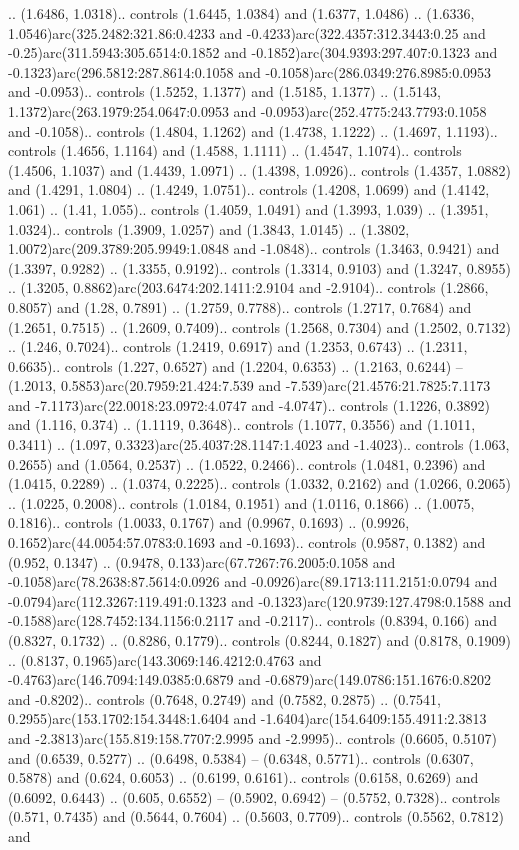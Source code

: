 .. (1.6486, 1.0318).. controls (1.6445, 1.0384) and (1.6377, 1.0486) .. (1.6336, 1.0546)arc(325.2482:321.86:0.4233 and -0.4233)arc(322.4357:312.3443:0.25 and -0.25)arc(311.5943:305.6514:0.1852 and -0.1852)arc(304.9393:297.407:0.1323 and -0.1323)arc(296.5812:287.8614:0.1058 and -0.1058)arc(286.0349:276.8985:0.0953 and -0.0953).. controls (1.5252, 1.1377) and (1.5185, 1.1377) .. (1.5143, 1.1372)arc(263.1979:254.0647:0.0953 and -0.0953)arc(252.4775:243.7793:0.1058 and -0.1058).. controls (1.4804, 1.1262) and (1.4738, 1.1222) .. (1.4697, 1.1193).. controls (1.4656, 1.1164) and (1.4588, 1.1111) .. (1.4547, 1.1074).. controls (1.4506, 1.1037) and (1.4439, 1.0971) .. (1.4398, 1.0926).. controls (1.4357, 1.0882) and (1.4291, 1.0804) .. (1.4249, 1.0751).. controls (1.4208, 1.0699) and (1.4142, 1.061) .. (1.41, 1.055).. controls (1.4059, 1.0491) and (1.3993, 1.039) .. (1.3951, 1.0324).. controls (1.3909, 1.0257) and (1.3843, 1.0145) .. (1.3802, 1.0072)arc(209.3789:205.9949:1.0848 and -1.0848).. controls (1.3463, 0.9421) and (1.3397, 0.9282) .. (1.3355, 0.9192).. controls (1.3314, 0.9103) and (1.3247, 0.8955) .. (1.3205, 0.8862)arc(203.6474:202.1411:2.9104 and -2.9104).. controls (1.2866, 0.8057) and (1.28, 0.7891) .. (1.2759, 0.7788).. controls (1.2717, 0.7684) and (1.2651, 0.7515) .. (1.2609, 0.7409).. controls (1.2568, 0.7304) and (1.2502, 0.7132) .. (1.246, 0.7024).. controls (1.2419, 0.6917) and (1.2353, 0.6743) .. (1.2311, 0.6635).. controls (1.227, 0.6527) and (1.2204, 0.6353) .. (1.2163, 0.6244) -- (1.2013, 0.5853)arc(20.7959:21.424:7.539 and -7.539)arc(21.4576:21.7825:7.1173 and -7.1173)arc(22.0018:23.0972:4.0747 and -4.0747).. controls (1.1226, 0.3892) and (1.116, 0.374) .. (1.1119, 0.3648).. controls (1.1077, 0.3556) and (1.1011, 0.3411) .. (1.097, 0.3323)arc(25.4037:28.1147:1.4023 and -1.4023).. controls (1.063, 0.2655) and (1.0564, 0.2537) .. (1.0522, 0.2466).. controls (1.0481, 0.2396) and (1.0415, 0.2289) .. (1.0374, 0.2225).. controls (1.0332, 0.2162) and (1.0266, 0.2065) .. (1.0225, 0.2008).. controls (1.0184, 0.1951) and (1.0116, 0.1866) .. (1.0075, 0.1816).. controls (1.0033, 0.1767) and (0.9967, 0.1693) .. (0.9926, 0.1652)arc(44.0054:57.0783:0.1693 and -0.1693).. controls (0.9587, 0.1382) and (0.952, 0.1347) .. (0.9478, 0.133)arc(67.7267:76.2005:0.1058 and -0.1058)arc(78.2638:87.5614:0.0926 and -0.0926)arc(89.1713:111.2151:0.0794 and -0.0794)arc(112.3267:119.491:0.1323 and -0.1323)arc(120.9739:127.4798:0.1588 and -0.1588)arc(128.7452:134.1156:0.2117 and -0.2117).. controls (0.8394, 0.166) and (0.8327, 0.1732) .. (0.8286, 0.1779).. controls (0.8244, 0.1827) and (0.8178, 0.1909) .. (0.8137, 0.1965)arc(143.3069:146.4212:0.4763 and -0.4763)arc(146.7094:149.0385:0.6879 and -0.6879)arc(149.0786:151.1676:0.8202 and -0.8202).. controls (0.7648, 0.2749) and (0.7582, 0.2875) .. (0.7541, 0.2955)arc(153.1702:154.3448:1.6404 and -1.6404)arc(154.6409:155.4911:2.3813 and -2.3813)arc(155.819:158.7707:2.9995 and -2.9995).. controls (0.6605, 0.5107) and (0.6539, 0.5277) .. (0.6498, 0.5384) -- (0.6348, 0.5771).. controls (0.6307, 0.5878) and (0.624, 0.6053) .. (0.6199, 0.6161).. controls (0.6158, 0.6269) and (0.6092, 0.6443) .. (0.605, 0.6552) -- (0.5902, 0.6942) -- (0.5752, 0.7328).. controls (0.571, 0.7435) and (0.5644, 0.7604) .. (0.5603, 0.7709).. controls (0.5562, 0.7812) and 